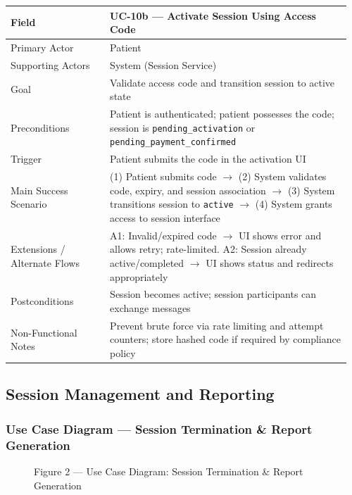 \documentclass[12pt]{article}
\begin{document}
\begin{longtable}{L{0.28\linewidth} L{0.68\linewidth}}
\toprule
\textbf{Field} & \textbf{UC-10b --- Activate Session Using Access Code} \\
\midrule
\endhead
Primary Actor & Patient \\
Supporting Actors & System (Session Service) \\
Goal & Validate access code and transition session to active state \\
Preconditions & Patient is authenticated; patient possesses the code; session is \texttt{pending\_activation} or \texttt{pending\_payment\_confirmed} \\
Trigger & Patient submits the code in the activation UI \\
Main Success Scenario & (1) Patient submits code $\rightarrow$ (2) System validates code, expiry, and session association $\rightarrow$ (3) System transitions session to \texttt{active} $\rightarrow$ (4) System grants access to session interface \\
Extensions / Alternate Flows & A1: Invalid/expired code $\rightarrow$ UI shows error and allows retry; rate-limited. A2: Session already active/completed $\rightarrow$ UI shows status and redirects appropriately \\
Postconditions & Session becomes active; session participants can exchange messages \\
Non-Functional Notes & Prevent brute force via rate limiting and attempt counters; store hashed code if required by compliance policy \\
\bottomrule
\end{longtable}

\subsection{Session Management and Reporting}
\subsubsection*{Use Case Diagram --- Session Termination \& Report Generation}
\begin{figure}[h]
  \centering
  \caption{Figure 2 --- Use Case Diagram: Session Termination \& Report Generation}
\end{figure}
\end{document}
